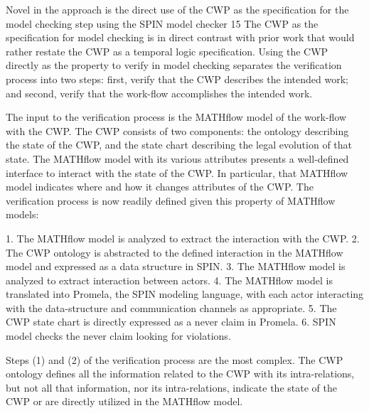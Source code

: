 \begin{itemize}
Novel in the approach is the direct use of the CWP as the specification for the model checking step using the SPIN model checker 15 The CWP as the specification for model checking is in direct contrast with prior work that would rather restate the CWP as a temporal logic specification. Using the CWP directly as the property to verify in model checking separates the verification process into two steps: first, verify that the CWP describes the intended work; and second, verify that the work-flow accomplishes the intended work. 

The input to the verification process is the MATHflow model of the work-flow with the CWP. The CWP consists of two components: the ontology describing the state of the CWP, and the state chart describing the legal evolution of that state. The MATHflow model with its various attributes presents a well-defined interface to interact with the state of the CWP. In particular, that MATHflow model indicates where and how it changes attributes of the CWP.  The verification process is now readily defined given this property of MATHflow models: 

1. The MATHflow model is analyzed to extract the interaction with the CWP.
2. The CWP ontology is abstracted to the defined interaction in the MATHflow model and expressed as a data structure in SPIN.
3. The MATHflow model is analyzed to extract interaction between actors. 
4. The MATHflow model is translated into Promela, the SPIN modeling language, with each actor interacting with the data-structure and communication channels as appropriate.
5. The CWP state chart is directly expressed as a never claim in Promela.
6. SPIN model checks the never claim looking for violations.

Steps (1) and (2) of the verification process are the most complex. The CWP ontology defines all the information related to the CWP with its intra-relations, but not all that information, nor its intra-relations, indicate the state of the CWP or are directly utilized in the MATHflow model. 


\end{itemize}
